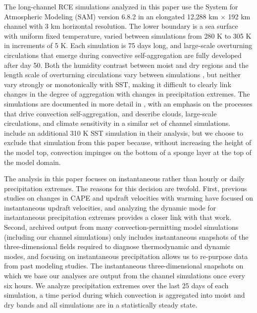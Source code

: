 \documentclass[twocol]{ametsoc}
\begin{document}
The long-channel RCE simulations analyzed in this paper use the System for Atmospheric Modeling (SAM) version 6.8.2 \citep{Khairoutdinov2003CloudSensitivities} in an elongated 12,288 km $\times$ 192 km channel with 3 km horizontal resolution. The lower boundary is a sea surface with uniform fixed temperature, varied between simulations from 280 K to 305 K  in increments of 5 K. Each simulation is 75 days long, and large-scale overturning circulations that emerge during convective self-aggregation are fully developed after day 50. Both the humidity contrast between moist and dry regions and the length scale of overturning circulations vary between simulations \citep{Wing2016Self-aggregationGeometry,Beucler2019ASelf-aggregation}, but neither vary strongly or monotonically with SST, making it difficult to clearly link changes in the degree of aggregation with changes in precipitation extremes. The simulations are documented in more detail in \citet{Wing2016Self-aggregationGeometry}, with an emphasis on the processes that drive convection self-aggregation, and \citet{Cronin2017CloudsModel} describe clouds, large-scale circulations, and climate sensitivity in a similar set of channel simulations. \citet{Wing2016Self-aggregationGeometry} include an additional 310 K SST simulation in their analysis, but we choose to exclude that simulation from this paper because, without increasing the height of the model top, convection impinges on the bottom of a sponge layer at the top of the model domain.

The analysis in this paper focuses on instantaneous rather than hourly or daily precipitation extremes. The reasons for this decision are twofold. First, previous studies on changes in CAPE and updraft velocities with warming have focused on instantaneous updraft velocities, and analyzing the dynamic mode for instantaneous precipitation extremes provides a closer link with that work. Second, archived output from many convection-permitting model simulations (including our channel simulations) only includes instantaneous snapshots of the three-dimensional fields required to diagnose thermodynamic and dynamic modes, and focusing on instantaneous precipitation allows us to re-purpose data from past modeling studies. The instantaneous three-dimensional snapshots on which we base our analyses are output from the channel simulations once every six hours. We analyze precipitation extremes over the last 25 days of each simulation, a time period during which convection is aggregated into moist and dry bands and all simulations are in a statistically steady state.
\end{document}
